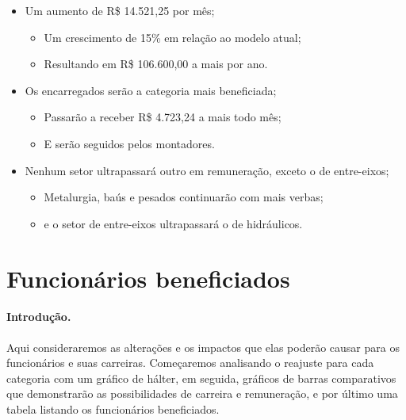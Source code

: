 \documentclass[a4paper, 12pt]{CSSullivanBusinessReport}
\begin{document}
\begin{fullwidth}
\begin{itemize}
	\item Um aumento de R\$ 14.521,25 por mês;
            \begin{itemize}
            \item Um crescimento de 15\% em relação ao modelo atual;
            \item Resultando em R\$ 106.600,00 a mais por ano.
            \end{itemize}
	\item Os encarregados serão a categoria mais beneficiada;
            \begin{itemize}
            \item Passarão a receber R\$ 4.723,24 a mais todo mês;
            \item E serão seguidos pelos montadores.
            \end{itemize}
	\item Nenhum setor ultrapassará outro em remuneração, exceto o de entre-eixos;
            \begin{itemize}
            \item Metalurgia, baús e pesados continuarão com mais verbas;
            \item e o setor de entre-eixos ultrapassará o de hidráulicos.
            \end{itemize}

\end{itemize}



\newpage


\section{Funcionários beneficiados}

\paragraph{Introdução.}Aqui consideraremos as alterações e os impactos que elas poderão causar para os funcionários e suas carreiras. Começaremos analisando o reajuste para cada categoria com um gráfico de hálter, em seguida, gráficos de barras comparativos que demonstrarão as possibilidades de carreira e remuneração, e por último uma tabela listando os funcionários beneficiados.


\end{fullwidth}
\end{document}
